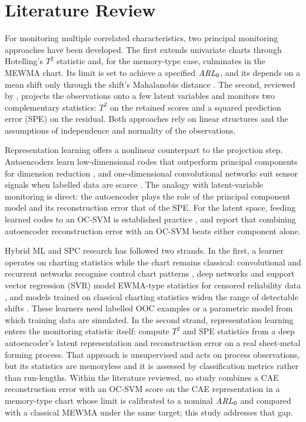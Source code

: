 \section{Literature Review}

For monitoring multiple correlated characteristics, two principal monitoring approaches have been developed. The first extends univariate charts through Hotelling's $T^2$ statistic and, for the memory-type case, culminates in the MEWMA chart. Its limit is set to achieve a specified $\mathit{ARL}_0$, and its \ARL{} depends on a mean shift only through the shift's Mahalanobis distance \citep{lowry_multivariate_1992}. The second, reviewed by \citet{macgregor_statistical_nodate},
projects the observations onto a few latent variables and monitors two complementary statistics:
$T^2$ on the retained scores and a squared prediction error (SPE) on the residual. Both approaches rely on linear structures and the assumptions of independence and normality of the observations.

Representation learning offers a nonlinear counterpart to the projection step. Autoencoders learn
low-dimensional codes that outperform principal components for dimension reduction \citep{hinton_reducing_2006}, and one-dimensional convolutional networks suit sensor signals when
labelled data are scarce \citep{kiranyaz_1d_2021}. The analogy with latent-variable monitoring is
direct: the autoencoder plays the role of the principal component model and its reconstruction
error that of the SPE. For the latent space, feeding learned codes to an OC-SVM is established practice \citep{alaverdyan_regularized_2020,
pinon_one-class_2023,mabu_disaster_2019}, and \citet{guzman_sidewalk_2026} report that combining
autoencoder reconstruction error with an OC-SVM beats either component alone.

Hybrid ML and SPC research has followed two strands. In the first, a learner operates on charting
statistics while the chart remains classical: convolutional and recurrent networks recognise control chart patterns \citep{yu_control_2021}, deep networks and support vector regression (SVR) model
EWMA-type statistics for censored reliability data \citep{lee_residual_2023,lee_monitoring_2024},
and models trained on classical charting statistics widen the range of detectable shifts
\citep{mukhtiar_enhanced_2025}. These learners need labelled OOC examples or a parametric
model from which training data are simulated. In the second strand, representation learning enters
the monitoring statistic itself: \citet{biegel_deep_2022} compute $T^2$ and SPE statistics from a
deep autoencoder's latent representation and reconstruction error on a real sheet-metal forming
process. That approach is unsupervised and acts on process observations, but its statistics are
memoryless and it is assessed by classification metrics rather than run-lengths. Within the
literature reviewed, no study combines a CAE reconstruction error with an OC-SVM score on the CAE
representation in a memory-type chart whose limit is calibrated to a nominal $\mathit{ARL}_0$ and compared
with a classical MEWMA under the same target; this study addresses that gap.
